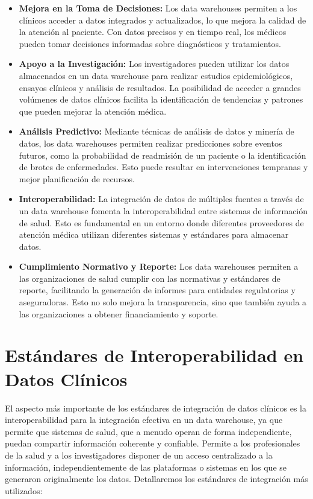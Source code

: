 \documentclass[12pt, a4paper, twoside]{article}
\begin{document}
	\begin{itemize}
		\item \textbf{Mejora en la Toma de Decisiones:} Los data warehouses permiten a los clínicos acceder a datos integrados y actualizados, lo que mejora la calidad de la atención al paciente. Con datos precisos y en tiempo real, los médicos pueden tomar decisiones informadas sobre diagnósticos y tratamientos.
		
		\item \textbf{Apoyo a la Investigación:} Los investigadores pueden utilizar los datos almacenados en un data warehouse para realizar estudios epidemiológicos, ensayos clínicos y análisis de resultados. La posibilidad de acceder a grandes volúmenes de datos clínicos facilita la identificación de tendencias y patrones que pueden mejorar la atención médica.
		
		\item \textbf{Análisis Predictivo:} Mediante técnicas de análisis de datos y minería de datos, los data warehouses permiten realizar predicciones sobre eventos futuros, como la probabilidad de readmisión de un paciente o la identificación de brotes de enfermedades. Esto puede resultar en intervenciones tempranas y mejor planificación de recursos.
		
		\item \textbf{Interoperabilidad:} La integración de datos de múltiples fuentes a través de un data warehouse fomenta la interoperabilidad entre sistemas de información de salud. Esto es fundamental en un entorno donde diferentes proveedores de atención médica utilizan diferentes sistemas y estándares para almacenar datos.
		
		\item \textbf{Cumplimiento Normativo y Reporte:} Los data warehouses permiten a las organizaciones de salud cumplir con las normativas y estándares de reporte, facilitando la generación de informes para entidades regulatorias y aseguradoras. Esto no solo mejora la transparencia, sino que también ayuda a las organizaciones a obtener financiamiento y soporte.
		
	\end{itemize}


	
	\section{Estándares de Interoperabilidad en Datos Clínicos}
	
	
	El aspecto más importante de los estándares de integración de datos clínicos es la interoperabilidad para la integración efectiva en un data warehouse, ya que permite que sistemas de salud, que a menudo operan de forma independiente, puedan compartir información coherente y confiable. \cite{meditecsInteroperabilidad}
	Permite a los profesionales de la salud y a los investigadores disponer de un acceso centralizado a la información, independientemente de las plataformas o sistemas en los que se generaron originalmente los datos.\cite{meditecsInteroperabilidad}
	Detallaremos los estándares de integración más utilizados:
	
\end{document}
